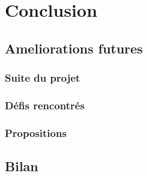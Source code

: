\chapter{Conclusion}
        \section{Ameliorations futures}
        \subsection{Suite du projet}
        \lipsum[1]
         \subsection{Défis rencontrés}
        \lipsum[1]
         \subsection{Propositions}
        \lipsum[1]
        \section{Bilan}
                     